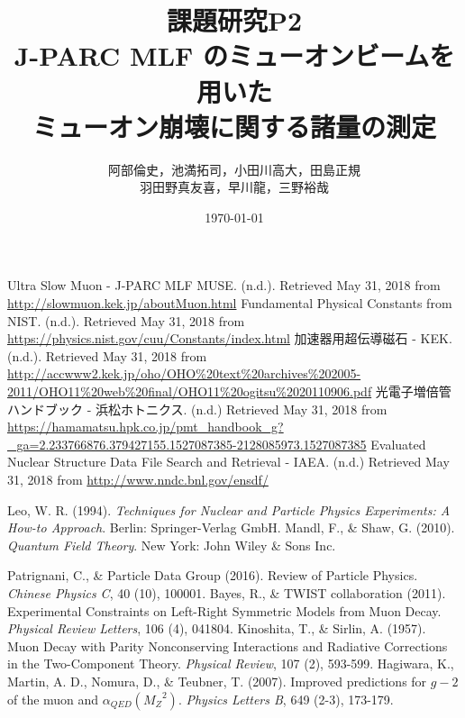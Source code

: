 \documentclass[titlepage]{jsarticle}
\begin{document}
\title{課題研究P2\\J-PARC MLF  のミューオンビームを用いた\\ミューオン崩壊に関する諸量の測定}
\author{阿部倫史，池満拓司，小田川高大，田島正規\\羽田野真友喜，早川龍，三野裕哉}
\date{\today}
\maketitle
\tableofcontents
\newpage
%









\newpage
\appendix


\begin{thebibliography}{99}
 Ultra Slow Muon - J-PARC MLF MUSE. (n.d.). Retrieved May 31, 2018
  from \url{http://slowmuon.kek.jp/aboutMuon.html}
 Fundamental Physical Constants from NIST. (n.d.). Retrieved May 31, 2018
  from \url{https://physics.nist.gov/cuu/Constants/index.html}
 加速器用超伝導磁石 - KEK. (n.d.). Retrieved May 31, 2018
  from \url{http://accwww2.kek.jp/oho/OHO\%20text\%20archives\%202005-2011/OHO11\%20web\%20final/OHO11\%20ogitsu\%2020110906.pdf}
 光電子増倍管ハンドブック - 浜松ホトニクス. (n.d.) Retrieved May 31, 2018
  from \url{https://hamamatsu.hpk.co.jp/pmt_handbook_g?\_ga=2.233766876.379427155.1527087385-2128085973.1527087385}
 Evaluated Nuclear Structure Data File Search and Retrieval - IAEA. (n.d.) Retrieved May 31, 2018
  from \url{http://www.nndc.bnl.gov/ensdf/}
  
 Leo, W. R. (1994). \textit{Techniques for Nuclear and Particle Physics Experiments: A How-to Approach}. Berlin: Springer-Verlag GmbH.
 Mandl, F., \& Shaw, G. (2010). \textit{Quantum Field Theory}. New York: John Wiley \& Sons Inc.

 Patrignani, C., \&  Particle Data Group (2016). Review of Particle Physics. \textit{Chinese Physics C}, 40 (10), 100001.
 Bayes, R., \& TWIST collaboration (2011). Experimental Constraints on Left-Right Symmetric Models from Muon Decay. \textit{Physical Review Letters}, 106 (4), 041804.
 Kinoshita, T., \& Sirlin, A. (1957). Muon Decay with Parity Nonconserving Interactions and Radiative Corrections in the Two-Component Theory. \textit{Physical Review}, 107 (2), 593-599.
 Hagiwara, K., Martin, A. D., Nomura, D., \& Teubner, T. (2007). Improved predictions for $g-2$ of the muon and $\alpha_{QED}({M_Z}^2)$. \textit{Physics Letters B}, 649 (2-3), 173-179.
  
\end{thebibliography} 
\end{document}

